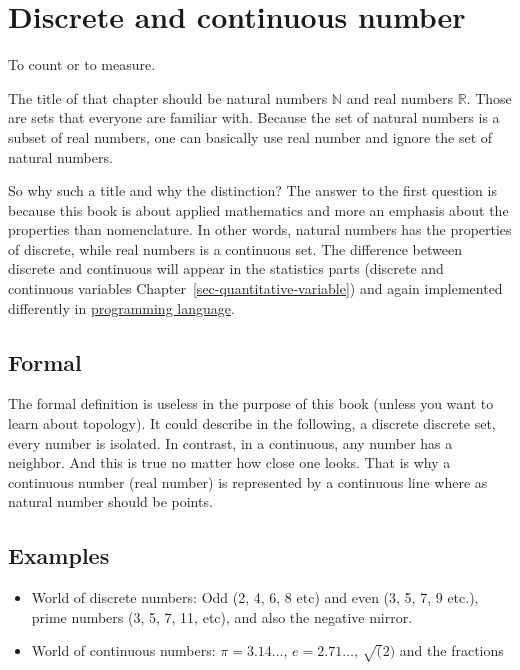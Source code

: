 \documentclass[
  letterpaper,
  DIV=11,
  numbers=noendperiod]{scrreprt}
\begin{document}
\chapter{Discrete and continuous number}\label{sec-discrete_continuous}

To count or to measure.

The title of that chapter should be natural numbers \(\mathbb{N}\) and
real numbers \(\mathbb{R}\). Those are sets that everyone are familiar
with. Because the set of natural numbers is a subset of real numbers,
one can basically use real number and ignore the set of natural numbers.

So why such a title and why the distinction? The answer to the first
question is because this book is about applied mathematics and more an
emphasis about the properties than nomenclature. In other words, natural
numbers has the properties of discrete, while real numbers is a
continuous set. The difference between discrete and continuous will
appear in the statistics parts (discrete and continuous variables
Chapter~\ref{sec-quantitative-variable}) and again implemented
differently in \href{@sec-numeric}{programming language}.

\section*{Formal}\label{formal-2}


The formal definition is useless in the purpose of this book (unless you
want to learn about topology). It could describe in the following, a
discrete discrete set, every number is isolated. In contrast, in a
continuous, any number has a neighbor. And this is true no matter how
close one looks. That is why a continuous number (real number) is
represented by a continuous line where as natural number should be
points.

\section*{Examples}\label{examples-2}


\begin{itemize}
\item
  World of discrete numbers: Odd (2, 4, 6, 8 etc) and even (3, 5, 7, 9
  etc.), prime numbers (3, 5, 7, 11, etc), and also the negative mirror.
\item
  World of continuous numbers: \(\pi = 3.14\ldots\), \(e = 2.71\ldots\),
  \(\sqrt(2)\) and the fractions
\end{itemize}
\end{document}
